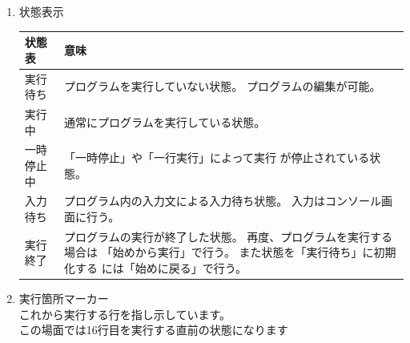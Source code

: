 \documentclass[11pt,a4j]{jarticle}
\begin{document}
\begin{enumerate}
\begin{enumerate}
\item 状態表示
\begin{table}[htbp]
  \vspace{-0.3cm}
  \begin{center}
    \begin{tabular}{l|p{11.0cm}} \hline
	状態表		& 意味 \\ \hline
	実行待ち	& プログラムを実行していない状態。
				プログラムの編集が可能。 \\ \hline
	実行中		& 通常にプログラムを実行している状態。 \\ \hline
	一時停止中	& 「一時停止」や「一行実行」によって実行
			  	が停止されている状態。 \\ \hline
	入力待ち	& プログラム内の入力文による入力待ち状態。
				入力はコンソール画面に行う。 \\ \hline
	実行終了	& プログラムの実行が終了した状態。
			 	再度、プログラムを実行する場合は
				「始めから実行」で行う。
				また状態を「実行待ち」に初期化する
				には「始めに戻る」で行う。 \\ \hline
    \end{tabular}
  \end{center}
  \vspace{-0.7cm}
\end{table}

\vspace{0.2cm}

\item 実行箇所マーカー \\
これから実行する行を指し示しています。 \\
この場面では16行目を実行する直前の状態になります
\end{enumerate}
\end{enumerate}
\end{document}
